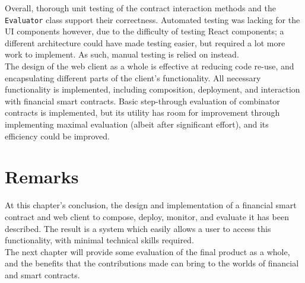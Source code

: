 Overall, thorough unit testing of the contract interaction methods and the \texttt{Evaluator} class support their correctness. Automated testing was lacking for the UI components however, due to the difficulty of testing React components; a different architecture could have made testing easier, but required a lot more work to implement. As such, manual testing is relied on instead. \\

The design of the web client as a whole is effective at reducing code re-use, and encapsulating different parts of the client's functionality. All necessary functionality is implemented, including composition, deployment, and interaction with financial smart contracts. Basic step-through evaluation of combinator contracts is implemented, but its utility has room for improvement through implementing maximal evaluation (albeit after significant effort), and its efficiency could be improved.


\section{Remarks}

At this chapter's conclusion, the design and implementation of a financial smart contract and web client to compose, deploy, monitor, and evaluate it has been described. The result is a system which easily allows a user to access this functionality, with minimal technical skills required. \\

The next chapter will provide some evaluation of the final product as a whole, and the benefits that the contributions made can bring to the worlds of financial and smart contracts.

